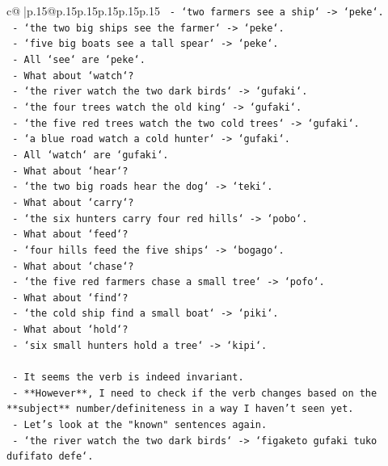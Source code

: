 \documentclass{article}
\begin{document}
{\begin{supertabular}{c@{$\;$}|p{.15\linewidth}@{}p{.15\linewidth}p{.15\linewidth}p{.15\linewidth}p{.15\linewidth}p{.15\linewidth}}
{{{\texttt{     {-} `two farmers see a ship` {-}> `peke`.} \\
\texttt{     {-} `the two big ships see the farmer` {-}> `peke`.} \\
\texttt{     {-} `five big boats see a tall spear` {-}> `peke`.} \\
\texttt{   {-} All `see` are `peke`.} \\
\texttt{   {-} What about `watch`?} \\
\texttt{     {-} `the river watch the two dark birds` {-}> `gufaki`.} \\
\texttt{     {-} `the four trees watch the old king` {-}> `gufaki`.} \\
\texttt{     {-} `the five red trees watch the two cold trees` {-}> `gufaki`.} \\
\texttt{     {-} `a blue road watch a cold hunter` {-}> `gufaki`.} \\
\texttt{   {-} All `watch` are `gufaki`.} \\
\texttt{   {-} What about `hear`?} \\
\texttt{     {-} `the two big roads hear the dog` {-}> `teki`.} \\
\texttt{   {-} What about `carry`?} \\
\texttt{     {-} `the six hunters carry four red hills` {-}> `pobo`.} \\
\texttt{   {-} What about `feed`?} \\
\texttt{     {-} `four hills feed the five ships` {-}> `bogago`.} \\
\texttt{   {-} What about `chase`?} \\
\texttt{     {-} `the five red farmers chase a small tree` {-}> `pofo`.} \\
\texttt{   {-} What about `find`?} \\
\texttt{     {-} `the cold ship find a small boat` {-}> `piki`.} \\
\texttt{   {-} What about `hold`?} \\
\texttt{     {-} `six small hunters hold a tree` {-}> `kipi`.} \\
\\ 
\texttt{   {-} It seems the verb is indeed invariant.} \\
\texttt{   {-} **However**, I need to check if the verb changes based on the **subject** number/definiteness in a way I haven't seen yet.} \\
\texttt{   {-} Let's look at the "known" sentences again.} \\
\texttt{   {-} `the river watch the two dark birds` {-}> `figaketo gufaki tuko dufifato defe`.} \\
}}}
\end{supertabular}}
\end{document}
